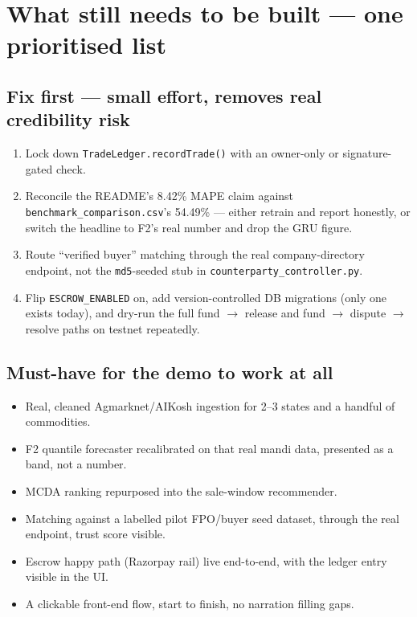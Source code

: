 \documentclass[11pt]{article}
\begin{document}
\clearpage
\section{What still needs to be built --- one prioritised list}

\subsection*{Fix first --- small effort, removes real credibility risk}
\begin{enumerate}[leftmargin=1.6em]
\item Lock down \texttt{TradeLedger.recordTrade()} with an owner-only or signature-gated check.
\item Reconcile the README's 8.42\% MAPE claim against \texttt{benchmark\_comparison.csv}'s 54.49\% ---
either retrain and report honestly, or switch the headline to F2's real number and drop the GRU figure.
\item Route ``verified buyer'' matching through the real company-directory endpoint, not the
\texttt{md5}-seeded stub in \texttt{counterparty\_controller.py}.
\item Flip \texttt{ESCROW\_ENABLED} on, add version-controlled DB migrations (only one exists today), and
dry-run the full fund $\to$ release and fund $\to$ dispute $\to$ resolve paths on testnet repeatedly.
\end{enumerate}

\subsection*{Must-have for the demo to work at all}
\begin{itemize}[leftmargin=1.4em]
\item Real, cleaned Agmarknet/AIKosh ingestion for 2--3 states and a handful of commodities.
\item F2 quantile forecaster recalibrated on that real mandi data, presented as a band, not a number.
\item MCDA ranking repurposed into the sale-window recommender.
\item Matching against a labelled pilot FPO/buyer seed dataset, through the real endpoint, trust score
visible.
\item Escrow happy path (Razorpay rail) live end-to-end, with the ledger entry visible in the UI.
\item A clickable front-end flow, start to finish, no narration filling gaps.
\end{itemize}
\end{document}
